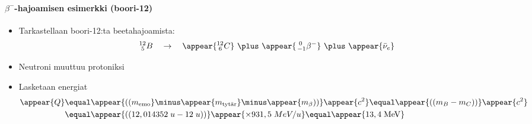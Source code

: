 \begin{frame}
\frametitle{\texorpdfstring{\culine[\sectiontitleulinecolor]{\sectiontitle}}{\sectiontitle} }
\framesubtitle{$\beta^{-}$-hajoamisen esimerkki (boori-12)}
\appear{}

%
\begin{itemize}
	\item Tarkastellaan boori-12:ta beetahajoamista:
\[
{ }_{\;5}^{12} B \quad \rightarrow \quad \appear{{ }_{\;6}^{12} C}  ~\plus~ \appear{{ }_{\,-1}^{~0} \beta^{-}}  ~\plus~ \appear{\bar{\nu}_{e}}
\]

\item Neutroni muuttuu protoniksi    

\item Lasketaan energiat  
$$
\begin{aligned}
\appear{Q} & \equal  \appear{\textrm{((} m_{\text {emo}}} \minus \appear{m_{\text {tytär}}}  \minus \appear{m_{\beta} \textrm{))}}  \appear{c^{2}}  \equal  \appear{\textrm{((} m_{B}-m_{C} \textrm{))}}  \appear{c^{2}} \\
&  \equal \appear{ \textrm{((} 12,014352 \;u-12 \;u \textrm{))}} \appear{\times 931,5 \;MeV / u} \equal \appear{13,4 \mathrm{\;MeV}}
\end{aligned}
$$
\end{itemize}

\endofslide 
\end{frame}

